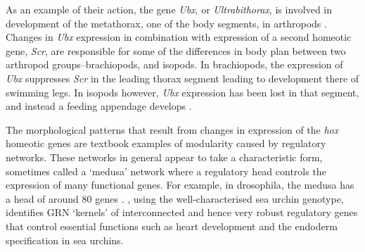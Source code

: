 As an example of their action, the gene \emph{Ubx}, or \emph{Ultrabithorax}, is involved in development of the \gls{metathorax}, one of the body segments, in \glspl{arthropod} \parencite[pg. 696-697]{Watson:2008fm}. Changes in \emph{Ubx} expression in combination with expression of a second homeotic gene, \emph{Scr}, are responsible for some of the differences in body plan between two arthropod groups--brachiopods, and isopods. In brachiopods, the expression of \emph{Ubx} suppresses \emph{Scr} in the leading thorax segment leading to development there of swimming legs. In isopods however, \emph{Ubx} expression has been lost in that segment, and instead a feeding appendage develops \parencite{Watson:2008fm}.

The morphological patterns that result from changes in expression of the \emph{hox} homeotic genes are textbook examples of modularity caused by regulatory networks. These networks in general appear to take a characteristic form, sometimes called a `medusa' network \parencite{Kauffman:2004zi,Aldana:2007da} where a regulatory head controls the expression of many functional genes. For example, in \gls{drosophila}, the medusa has a head of around 80 genes \parencite{Aldana:2007da}. \Textcite{Davidson:2006wi}, using the well-characterised sea urchin genotype, identifies GRN `kernels' of interconnected and hence very robust regulatory genes that control essential functions such as heart development and the endoderm specification in sea urchins. 


